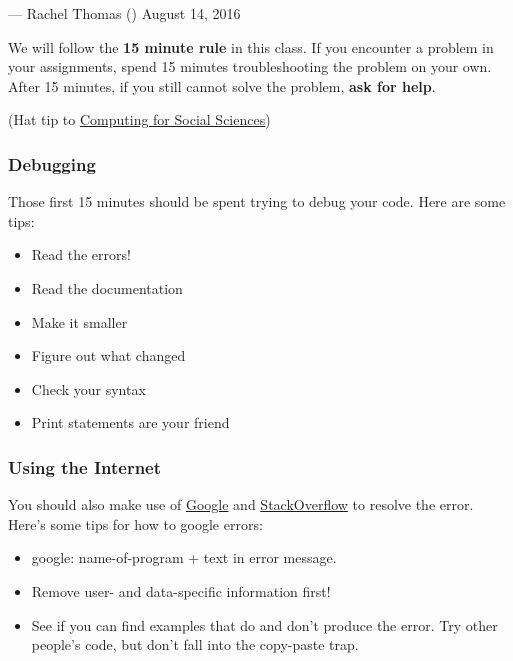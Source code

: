 \documentclass[]{book}
\providecommand{\tightlist}{%
  \setlength{\itemsep}{0pt}\setlength{\parskip}{0pt}}
\begin{document}
--- Rachel Thomas (\citet{math_rachel}) August 14, 2016

We will follow the \textbf{15 minute rule} in this class. If you encounter a problem in your assignments, spend 15 minutes troubleshooting the problem on your own. After 15 minutes, if you still cannot solve the problem, \textbf{ask for help}.

(Hat tip to \href{https://cfss.uchicago.edu/faq/asking-questions/}{Computing for Social Sciences})

\hypertarget{debugging}{%
\subsubsection*{Debugging}\label{debugging}}

Those first 15 minutes should be spent trying to debug your code. Here are some tips:

\begin{itemize}
\tightlist
\item
  Read the errors!
\item
  Read the documentation
\item
  Make it smaller
\item
  Figure out what changed
\item
  Check your syntax
\item
  Print statements are your friend
\end{itemize}

\hypertarget{using-the-internet}{%
\subsubsection*{Using the Internet}\label{using-the-internet}}

You should also make use of \href{https://www.google.com}{Google} and \href{http://stackoverflow.com/}{StackOverflow} to resolve the error. Here's some tips for how to google errors:

\begin{itemize}
\tightlist
\item
  google: name-of-program + text in error message.
\item
  Remove user- and data-specific information first!
\item
  See if you can find examples that do and don't produce the error. Try other people's code, but don't fall into the copy-paste trap.
\end{itemize}
\end{document}
